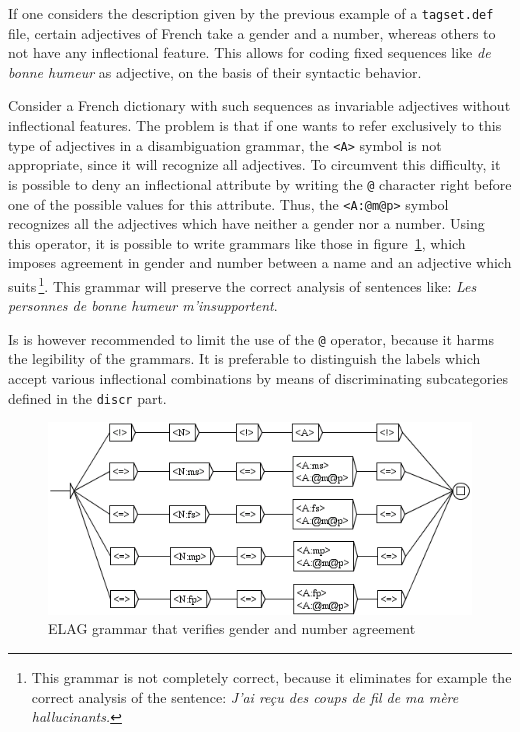 \bigskip
\noindent If one considers the description given by the previous example of a
\verb$tagset.def$ file, certain adjectives of French take a gender and a number,
whereas others to not have any inflectional feature. This allows for coding fixed
sequences like \textit{de bonne humeur} as adjective, on the basis of their
syntactic behavior.

\bigskip
\noindent Consider a French dictionary with such sequences as invariable adjectives without
inflectional features. The problem is that if one wants to refer exclusively to
this type of adjectives in a disambiguation grammar, the \verb$<A>$ symbol is not
appropriate, since it will recognize all adjectives. To circumvent this
difficulty, it is possible to deny an inflectional attribute by writing the
\verb$@$ character right before one of the possible values for this attribute.
Thus, the \verb$<A:@m@p>$ symbol recognizes all the adjectives which have neither
a gender nor a number. Using this operator, it is possible to write grammars like
those in figure~\ref{fig-NA}, which imposes agreement in gender and number
between a name and an adjective which suits\,\footnote{This grammar is not
completely correct, because it eliminates for example the correct analysis of the
sentence: \textit{J'ai re\c{c}u des coups de fil de ma m\`ere hallucinants.}}.
This grammar will preserve the correct analysis of sentences like: \textit{Les
personnes de bonne humeur m'insupportent}.

\bigskip
\noindent Is is however recommended to limit the use of the \verb$@$ operator, because it
harms the legibility of the grammars. It is preferable to distinguish the labels
which accept various inflectional combinations by means of discriminating
subcategories defined in the \verb$discr$ part.

\begin{figure}[!h]
\begin{center}
\includegraphics[width=12cm]{resources/img/fig7-19.png}
\caption{ELAG grammar that verifies gender and number agreement\label{fig-NA}}
\end{center}
\end{figure}

